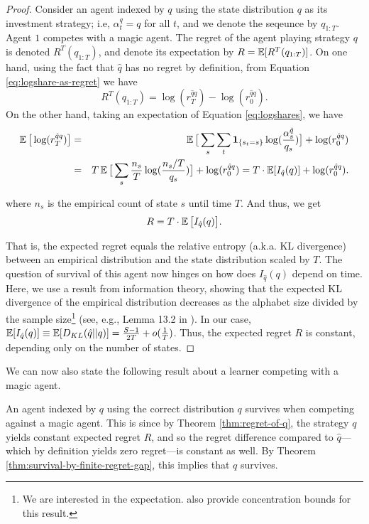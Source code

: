 \begin{proof}
Consider an agent indexed by $q$ using the state distribution $q$ as its investment strategy; i.e, $\alpha^q_{t} = q$ for all $t$, and we denote the seqeunce by $q_{1:T}$. Agent $1$ competes with a magic agent. 
The regret of the agent playing strategy $q$  is denoted $R^T(q_{1:T})$, and denote its expectation  
by $R = \operatorname{\mathbb{E}}[R^T(q_{1:T})]$. On one hand, using the fact that $\hat{q}$ has no regret by definition, from Equation \ref{eq:logshare-as-regret} we have   
\[
R^T(q_{1:T}) = \log(r^{\hat{q}q}_T) - \log(r^{\hat{q}q}_0).
\] 
On the other hand, taking an expectation of Equation \ref{eq:logshares}, we have
\begin{eqnarray*}
     \operatorname{\mathbb{E}} \big[\log(r^{\hat{q}q}_T)\big] & = & 
     \operatorname{\mathbb{E}} \big[\sum_s \sum_t \mathbf{1}_{\{s_t = s\}} \log(\frac{\alpha^{\hat{q}}_{s}}{q_{s}})\big]+ \log(r^{\hat{q}q}_{0}) \\
     & = &
     T \operatorname{\mathbb{E}} \big[\sum_s \frac{n_s}{T} \log(\frac{n_s/T}{q_s})\big]+ \log(r^{\hat{q}q}_{0})
      = 
     T  \cdot 
     \operatorname{\mathbb{E}}[I_{\hat{q}}(q)] + \log(r^{\hat{q}q}_{0}).
\end{eqnarray*}

where $n_s$ is the empirical count of state $s$ until time $T$. And thus, we get
    \[
    R =  T \cdot \operatorname{\mathbb{E}} \big[I_{\hat{q}}(q)\big].
    \]
    
That is, the expected regret equals the relative entropy (a.k.a. KL divergence) between an empirical distribution and the state distribution scaled by $T$.  The question of survival of this agent now hinges on how does $I_{\hat{q}}(q)$ depend on time. 
Here, we use a result from information theory, showing that the expected KL divergence of the empirical distribution decreases as the alphabet size divided by the sample size\footnote{We are interested in the expectation. \cite{mardia2020concentration} also provide concentration bounds for this result.} (see, e.g., Lemma 13.2 in \cite{polyanskiy2024information}). In our case, $\operatorname{\mathbb{E}}[I_{\hat{q}}(q)] \equiv \operatorname{\mathbb{E}}[D_{KL}(\hat{q}||q)] = \frac{S-1}{2T} + o(\frac{1}{T})$.
Thus, the expected regret $R$ is constant, depending only on the number of states. 
\end{proof}
We can now also state the following result about a learner competing with a magic agent.
\begin{corollary}\label{cor:q-survives-against-zero-regret}
An agent indexed by $q$ using the correct distribution $q$ survives when competing against a magic agent. This is since by Theorem \ref{thm:regret-of-q}, the strategy $q$ yields constant expected regret $R$, and so the regret difference compared to $\hat{q}$---which  by definition yields zero regret---is constant as well. By Theorem \ref{thm:survival-by-finite-regret-gap}, this implies that $q$ survives.
\end{corollary}

